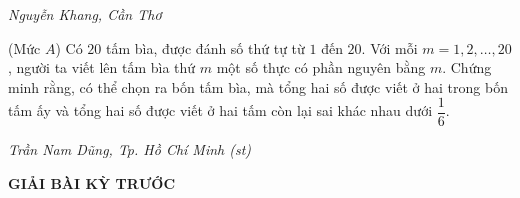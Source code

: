 \begin{multicols}{2}
\begin{figure}[H]
		\vspace*{-10pt}
	\end{figure}
	\begin{flushright}
		\textit{\small Nguyễn Khang, Cần Thơ}
	\end{flushright}
	{\color{thachthuctoanhoc}{\usefont{T5}{qag}{b}{n} P690.}}
	(Mức $A$) Có $20$ tấm bìa, được đánh số thứ tự từ $1$ đến $20$. Với mỗi $m=1,2,\ldots,20$, người ta viết lên tấm bìa thứ $m$ một số thực có phần nguyên bằng $m$. Chứng minh rằng, có thể chọn ra bốn tấm bìa, mà tổng hai số được viết ở hai trong bốn tấm ấy và tổng hai số được viết ở hai tấm còn lại sai khác nhau dưới $\dfrac16$.
	\begin{flushright}
		\textit{\small{Trần Nam Dũng, Tp. Hồ Chí Minh (st)}}
	\end{flushright}
\end{multicols}
\newpage
\centerline{{\large{\textbf{\color{thachthuctoanhoc}GIẢI BÀI KỲ TRƯỚC}}}}
\vspace*{-5pt}
